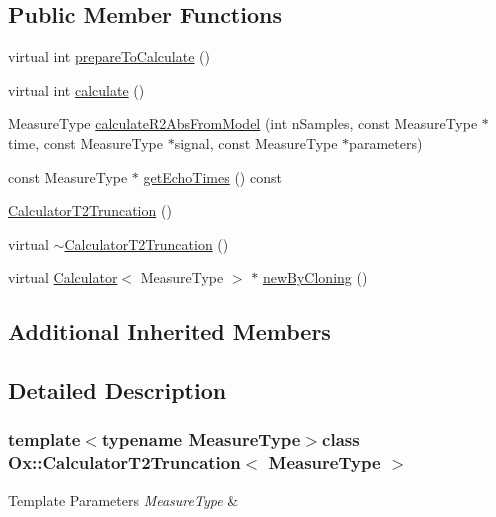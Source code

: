 \subsection*{Public Member Functions}
\begin{DoxyCompactItemize}
\item 
virtual int \hyperlink{class_ox_1_1_calculator_t2_truncation_a87a5d80163f3909658498c341c7c1a7a}{prepare\-To\-Calculate} ()
\item 
virtual int \hyperlink{class_ox_1_1_calculator_t2_truncation_a90077df2125150b62324c83da464b02b}{calculate} ()
\item 
Measure\-Type \hyperlink{class_ox_1_1_calculator_t2_truncation_a7dba06e66ae1dc710f9af18af68107db}{calculate\-R2\-Abs\-From\-Model} (int n\-Samples, const Measure\-Type $\ast$time, const Measure\-Type $\ast$signal, const Measure\-Type $\ast$parameters)
\item 
const Measure\-Type $\ast$ \hyperlink{class_ox_1_1_calculator_t2_truncation_ad433198801084c091bcea9430c47412f}{get\-Echo\-Times} () const 
\item 
\hyperlink{class_ox_1_1_calculator_t2_truncation_a3f9e6e96cebf84643a055aef0ffb3630}{Calculator\-T2\-Truncation} ()
\item 
virtual \hyperlink{class_ox_1_1_calculator_t2_truncation_a7f5dabe2ee97aae7b67941023d92fdd6}{$\sim$\-Calculator\-T2\-Truncation} ()
\item 
virtual \hyperlink{class_ox_1_1_calculator}{Calculator}$<$ Measure\-Type $>$ $\ast$ \hyperlink{class_ox_1_1_calculator_t2_truncation_a6accdab54ee98182f12707786a461c20}{new\-By\-Cloning} ()
\end{DoxyCompactItemize}
\subsection*{Additional Inherited Members}


\subsection{Detailed Description}
\subsubsection*{template$<$typename Measure\-Type$>$class Ox\-::\-Calculator\-T2\-Truncation$<$ Measure\-Type $>$}


\begin{DoxyTemplParams}{Template Parameters}
{\em Measure\-Type} & \\
\hline
\end{DoxyTemplParams}


